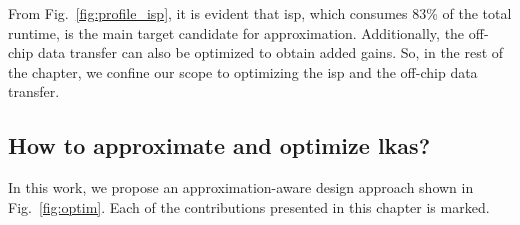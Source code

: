 \par From Fig.~\ref{fig:profile_isp}, it is evident that \gls{isp}, which consumes 83\% of the total runtime, is the main target candidate for approximation. Additionally, the off-chip data transfer can also be optimized to obtain added gains. So, in the rest of the chapter, we confine our scope to optimizing the \gls{isp} and the off-chip data transfer.

\subsection{How to approximate and optimize \gls{lkas}?}\label{coarse_approx}
In this work, we propose an approximation-aware design approach shown in Fig.~\ref{fig:optim}. Each of the contributions presented in this chapter is marked. 

